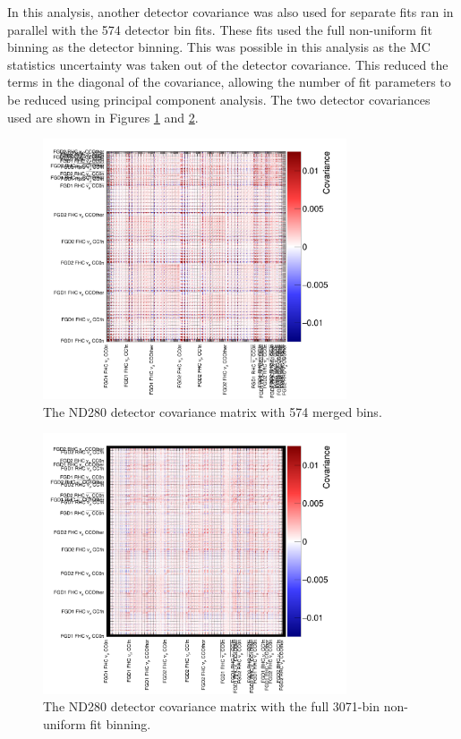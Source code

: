 In this analysis, another detector covariance was also used for separate fits ran in parallel with the 574 detector bin fits. These fits used the full non-uniform fit binning as the detector binning. This was possible in this analysis as the MC statistics uncertainty was taken out of the detector covariance. This reduced the terms in the diagonal of the covariance, allowing the number of fit parameters to be reduced using principal component analysis. The two detector covariances used are shown in Figures \ref{fig:detcov574} and \ref{fig:detcovFit}.

\begin{figure}[h]
\centering
\includegraphics*[width=0.8\textwidth,clip]{figs/detcov574}
\caption{The ND280 detector covariance matrix with 574 merged bins.}\label{fig:detcov574}
\end{figure}

\begin{figure}[h]
\centering
\includegraphics*[width=0.8\textwidth,clip]{figs/detcovFit}
\caption{The ND280 detector covariance matrix with the full 3071-bin non-uniform fit binning.}\label{fig:detcovFit}
\end{figure}

